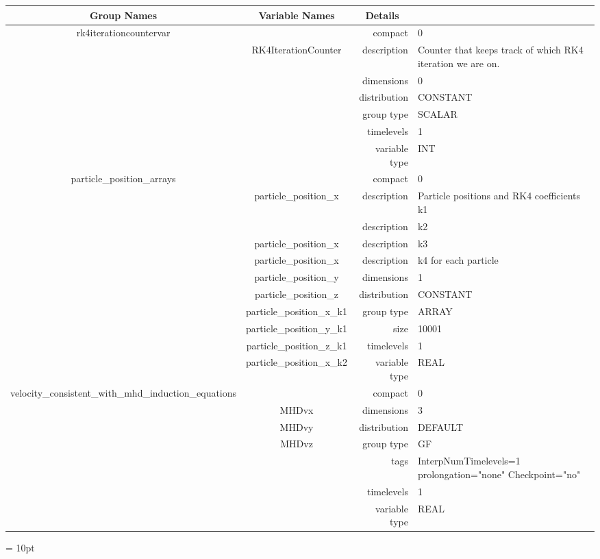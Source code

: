 \begin{tabular*}{150mm}{|c|c@{\extracolsep{\fill}}|rl|} \hline 
~ {\bf Group Names} ~ & ~ {\bf Variable Names} ~  &{\bf Details} ~ & ~\\ 
\hline 
rk4iterationcountervar &  & compact & 0 \\ 
 & RK4IterationCounter & description & Counter that keeps track of which RK4 iteration we are on. \\ 
 &  & dimensions & 0 \\ 
 &  & distribution & CONSTANT \\ 
 &  & group type & SCALAR \\ 
 &  & timelevels & 1 \\ 
 &  & variable type & INT \\ 
\hline 
particle\_position\_arrays &  & compact & 0 \\ 
 & particle\_position\_x & description & Particle positions and RK4 coefficients k1 \\ 
& ~ & description & k2 \\ 
 & particle\_position\_x & description & k3 \\ 
 & particle\_position\_x & description & k4 for each particle \\ 
 & particle\_position\_y & dimensions & 1 \\ 
 & particle\_position\_z & distribution & CONSTANT \\ 
 & particle\_position\_x\_k1 & group type & ARRAY \\ 
 & particle\_position\_y\_k1 & size & 10001 \\ 
 & particle\_position\_z\_k1 & timelevels & 1 \\ 
 & particle\_position\_x\_k2 & variable type & REAL \\ 
\hline 
velocity\_consistent\_with\_mhd\_induction\_equations &  & compact & 0 \\ 
 & MHDvx & dimensions & 3 \\ 
 & MHDvy & distribution & DEFAULT \\ 
 & MHDvz & group type & GF \\ 
 &  & tags & InterpNumTimelevels=1 prolongation="none" Checkpoint="no" \\ 
 &  & timelevels & 1 \\ 
 &  & variable type & REAL \\ 
\hline 
\end{tabular*} 



\vspace{5mm}\parskip = 10pt 

